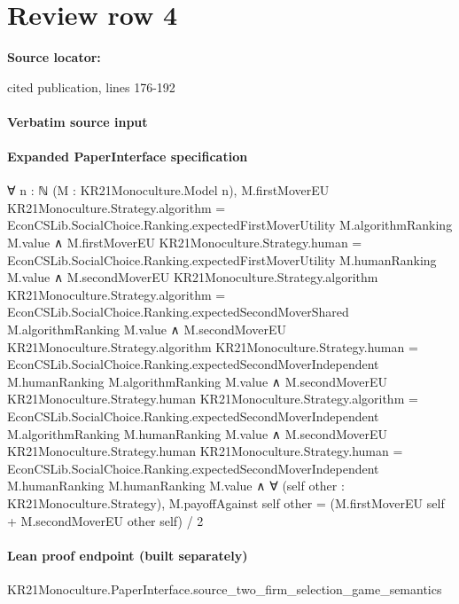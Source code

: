 \documentclass[10pt]{article}
\begin{document}
\section*{Review row 4}
\textbf{Source locator:} {\footnotesize\raggedright cited publication, lines 176-\allowbreak{}192\par}
\paragraph{Verbatim source input}
\begin{ReviewVerbatim}
\end{ReviewVerbatim}


\paragraph{Expanded PaperInterface specification}
\begin{ReviewVerbatim}
∀ {n : ℕ} (M : KR21Monoculture.Model n),
  M.firstMoverEU KR21Monoculture.Strategy.algorithm =
      EconCSLib.SocialChoice.Ranking.expectedFirstMoverUtility M.algorithmRanking M.value ∧
    M.firstMoverEU KR21Monoculture.Strategy.human =
        EconCSLib.SocialChoice.Ranking.expectedFirstMoverUtility M.humanRanking M.value ∧
      M.secondMoverEU KR21Monoculture.Strategy.algorithm KR21Monoculture.Strategy.algorithm =
          EconCSLib.SocialChoice.Ranking.expectedSecondMoverShared M.algorithmRanking M.value ∧
        M.secondMoverEU KR21Monoculture.Strategy.algorithm KR21Monoculture.Strategy.human =
            EconCSLib.SocialChoice.Ranking.expectedSecondMoverIndependent M.humanRanking M.algorithmRanking M.value ∧
          M.secondMoverEU KR21Monoculture.Strategy.human KR21Monoculture.Strategy.algorithm =
              EconCSLib.SocialChoice.Ranking.expectedSecondMoverIndependent M.algorithmRanking M.humanRanking M.value ∧
            M.secondMoverEU KR21Monoculture.Strategy.human KR21Monoculture.Strategy.human =
                EconCSLib.SocialChoice.Ranking.expectedSecondMoverIndependent M.humanRanking M.humanRanking M.value ∧
              ∀ (self other : KR21Monoculture.Strategy),
                M.payoffAgainst self other = (M.firstMoverEU self + M.secondMoverEU other self) / 2
\end{ReviewVerbatim}

\paragraph{Lean proof endpoint (built separately)}\begin{ReviewVerbatim}
KR21Monoculture.PaperInterface.source_two_firm_selection_game_semantics
\end{ReviewVerbatim}
\end{document}

